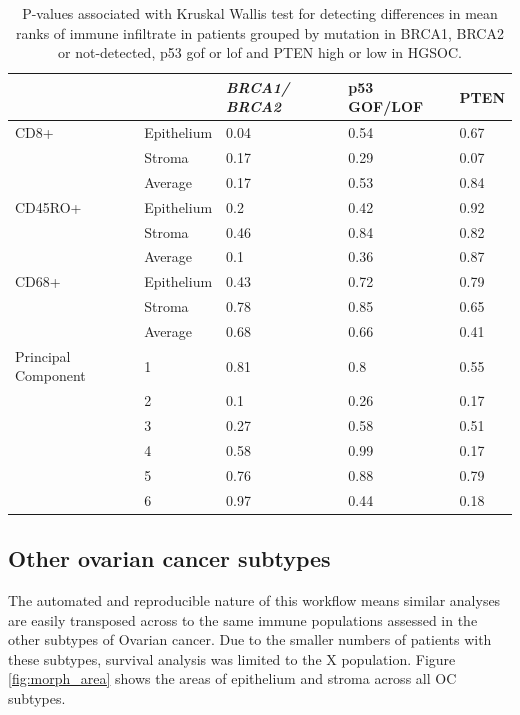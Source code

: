 \begin{table}[]
    \centering
    \begin{tabular}{lllll} \hline
     	&		&	\textit{BRCA1/ BRCA2}	&	p53 GOF/LOF	&	PTEN	\\ \hline
CD8+	&	Epithelium	&	0.04	&	0.54	&	0.67	\\
	&	Stroma	&	0.17	&	0.29	&	0.07	\\
	&	Average	&	0.17	&	0.53	&	0.84	\\
CD45RO+	&	Epithelium	&	0.2	&	0.42	&	0.92	\\
	&	Stroma	&	0.46	&	0.84	&	0.82	\\
	&	Average	&	0.1	&	0.36	&	0.87	\\
CD68+	&	Epithelium	&	0.43	&	0.72	&	0.79	\\
	&	Stroma	&	0.78	&	0.85	&	0.65	\\
	&	Average	&	0.68	&	0.66	&	0.41	\\
Principal Component	&	1	&	0.81	&	0.8	&	0.55	\\
	&	2	&	0.1	&	0.26	&	0.17	\\
	&	3	&	0.27	&	0.58	&	0.51	\\
	&	4	&	0.58	&	0.99	&	0.17	\\
	&	5	&	0.76	&	0.88	&	0.79	\\
	&	6	&	0.97	&	0.44	&	0.18	\\
    \hline
    \end{tabular}
    \caption[Significance of Kruskal Wallis tests of infiltrate against genomic subtype]{P-values associated with Kruskal Wallis test for detecting differences in mean ranks of immune infiltrate in patients grouped by mutation in BRCA1, BRCA2 or not-detected, p53 gof or lof and PTEN high or low in HGSOC.}
    \label{tab:genomic}
\end{table}

\subsection{Other ovarian cancer subtypes}

The automated and reproducible nature of this workflow means similar analyses are easily transposed across to the same immune populations assessed in the other subtypes of Ovarian cancer. Due to the smaller numbers of patients with these subtypes, survival analysis was limited to the X population. Figure \ref{fig:morph_area} shows the areas of epithelium and stroma across all OC subtypes.

